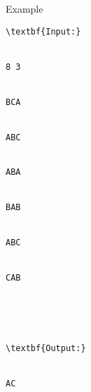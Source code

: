 Example
\begin{verbatim}
\textbf{Input:}


8 3


BCA


ABC


ABA


BAB


ABC


CAB





\textbf{Output:}


AC\end{verbatim}